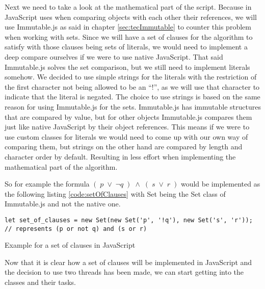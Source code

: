 Next we need to take a look at the mathematical part of the script. Because in JavaScript uses when comparing objects with each other their references, we will use Immutable.js as said in chapter \ref{sec:tecImmutable} to counter this problem when working with sets. Since we will have a set of clauses for the algorithm to satisfy with those clauses being sets of literals, we would need to implement a deep compare ourselves if we were to use native JavaScript. That said Immutable.js solves the set comparison, but we still need to implement literals somehow. We decided to use simple strings for the literals with the restriction of the first character not being allowed to be an ``!'', as we will use that character to indicate that the literal is negated. The choice to use strings is based on the same reason for using Immutable.js for the sets. Immutable.js has immutable structures that are compared by value, but for other objects Immutable.js compares them just like native JavaScript by their object references. This means if we were to use custom classes for literals we would need to come up with our own way of comparing them, but strings on the other hand are compared by length and character order by default. Resulting in less effort when implementing the mathematical part of the algorithm.

So for example the formula $(\; p\; \lor\; \neg q\; )\; \land\; (\; s\; \lor\; r\; )$ would be implemented as the following listing \ref{code:setOfClauses} with Set being the Set class of Immutable.js and not the native one.

\begin{listing}[h!]
\begin{verbatim}
let set_of_clauses = new Set(new Set('p', '!q'), new Set('s', 'r'));
// represents (p or not q) and (s or r)
\end{verbatim}
    \caption{Example for a set of clauses in JavaScript}
    \label{code:setOfClauses}
\end{listing}

Now that it is clear how a set of clauses will be implemented in JavaScript and the decision to use two threads has been made, we can start getting into the classes and their tasks.

